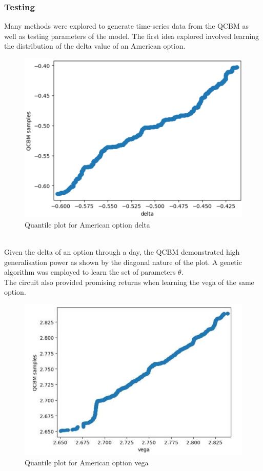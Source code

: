\documentclass[12pt]{article}
\numberwithin{equation}{section}
\begin{document}
\subsubsection{Testing}
Many methods were explored to generate time-series data from the QCBM as well as 
testing parameters of the model. The first idea explored involved learning the 
distribution of the delta value of an American option.
\begin{figure}[h]
    \centering
    \includegraphics[scale=0.24]{QCBM-delta.png}
    \caption{Quantile plot for American option delta}
\end{figure}
\\
Given the delta of an option through a day, the QCBM demonstrated high
generalisation power as shown by the diagonal nature of the plot. A genetic 
algorithm was employed to learn the set of parameters $\theta$.\\
The circuit also provided promising returns when learning the vega of the same 
option. 
\begin{figure}[h]
    \centering
    \includegraphics[scale=0.75]{QCBM-vega.png}
    \caption{Quantile plot for American option vega}
\end{figure}
\end{document}
